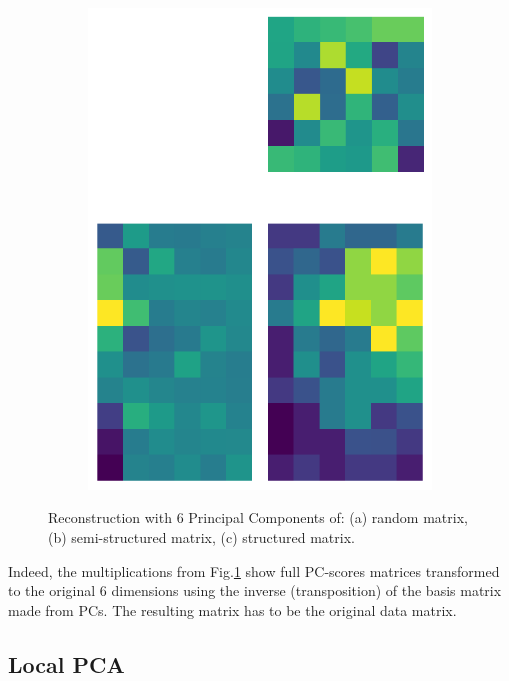 \documentclass[10pt,twocolumn]{article}
\begin{document}
\begin{figure}[H]
\begin{subfigure}[t]{.15\textwidth}
\includegraphics[scale=.2]{structured-matrix-reconstruction-PCs-6.png}
\caption{ }
\end{subfigure}
\caption{Reconstruction with 6 Principal Components of: (a) random matrix, (b) semi-structured matrix, (c) structured matrix.}
\label{fig:matrices-reconstruction-6}
\end{figure}

Indeed, the multiplications from Fig.\ref{fig:matrices-reconstruction-6} show full PC-scores matrices transformed to the original 6 dimensions using the inverse (transposition) of the basis matrix made from PCs. The resulting matrix has to be the original data matrix.



\subsection{Local PCA}
\end{document}

